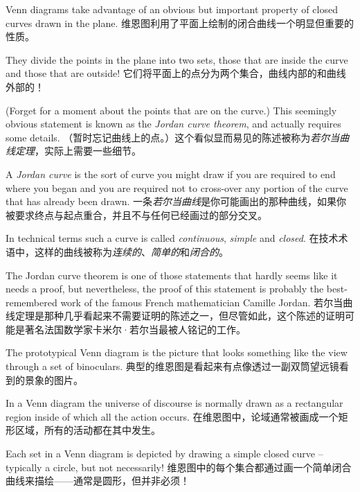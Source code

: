Venn diagrams take 
advantage of an obvious but important property of closed 
curves drawn in the plane.
维恩图利用了平面上绘制的闭合曲线一个明显但重要的性质。

They divide the points in the
plane into two sets, those that are inside the curve and
those that are outside!
它们将平面上的点分为两个集合，曲线内部的和曲线外部的！

(Forget for a moment about the points
that are on the curve.)  This seemingly obvious statement
is known as the 
\emph{Jordan curve theorem}, and actually
requires some details.
（暂时忘记曲线上的点。）这个看似显而易见的陈述被称为\emph{若尔当曲线定理}，实际上需要一些细节。

A 
\emph{Jordan curve} is the sort 
of curve you might draw if you are required to end where
you began and you are required not to cross-over any portion 
of the curve that has already been drawn.
一条\emph{若尔当曲线}是你可能画出的那种曲线，如果你被要求终点与起点重合，并且不与任何已经画过的部分交叉。

In technical
terms such a curve is called \emph{continuous}, \emph{simple} 
and \emph{closed}.
在技术术语中，这样的曲线被称为\emph{连续的}、\emph{简单的}和\emph{闭合的}。

The Jordan curve theorem is one of those statements that hardly
seems like it needs a proof, but nevertheless, the proof of this
statement is probably the best-remembered work of the famous
French mathematician Camille Jordan.
若尔当曲线定理是那种几乎看起来不需要证明的陈述之一，但尽管如此，这个陈述的证明可能是著名法国数学家卡米尔·若尔当最被人铭记的工作。

The prototypical Venn diagram is the picture that looks something
like the view through a set of binoculars.
典型的维恩图是看起来有点像透过一副双筒望远镜看到的景象的图片。
\vspace{.1in}



\vspace{.1in}

In a Venn diagram the 
universe of discourse is normally drawn as
a rectangular region inside of which all the action occurs.
在维恩图中，论域通常被画成一个矩形区域，所有的活动都在其中发生。

Each
set in a Venn diagram is depicted by drawing a simple closed curve -- 
typically a circle, but not necessarily!
维恩图中的每个集合都通过画一个简单闭合曲线来描绘——通常是圆形，但并非必须！

